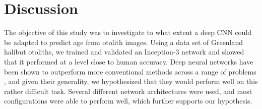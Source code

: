 \documentclass[10pt,letterpaper]{article}
\begin{document}
\section*{Discussion}


The objective of this study was to investigate to what extent a deep CNN could be adapted to predict age from otolith images. Using a data set of Greenland halibut otoliths, we trained and validated an Inception-3 network and showed that it performed at a level close to human accuracy. Deep neural networks have been shown to outperform more conventional methods across a range of problems \citep[e.g.][]{krizhevsky2012imagenet}, and given their generality, we hypothesized that they would perform well on this rather difficult task. Several different network architectures were used, and most configurations were able to perform well, which further supports our hypothesis.

\end{document}
